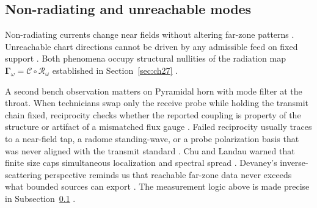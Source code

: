 \subsection{Non-radiating and unreachable modes}
\label{sec:ch471}
Non-radiating currents change near fields without altering far-zone patterns \cite{stratton1941}. Unreachable chart directions cannot be driven by any admissible feed on fixed support \cite{hansen1988}. Both phenomena occupy structural nullities of the radiation map \(\boldsymbol{\Gamma}_\omega=\mathcal{C}\circ\mathcal{R}_\omega\) established in Section~\ref{sec:ch27} \cite{stratton1941}.
\begin{physicalvignette}
A second bench observation matters on Pyramidal horn with mode filter at the throat. When technicians swap only the receive probe while holding the transmit chain fixed, reciprocity checks whether the reported coupling is property of the structure or artifact of a mismatched flux gauge \cite{stratton1941}. Failed reciprocity usually traces to a near-field tap, a radome standing-wave, or a probe polarization basis that was never aligned with the transmit standard \cite{hansen1988}.
Chu and Landau warned that finite size caps simultaneous localization and spectral spread \cite{chu1948}. Devaney's inverse-scattering perspective reminds us that reachable far-zone data never exceeds what bounded sources can export \cite{devaney2004}.
The measurement logic above is made precise in Subsection~\ref{sec:ch471} \cite{stratton1941}.
\end{physicalvignette}
